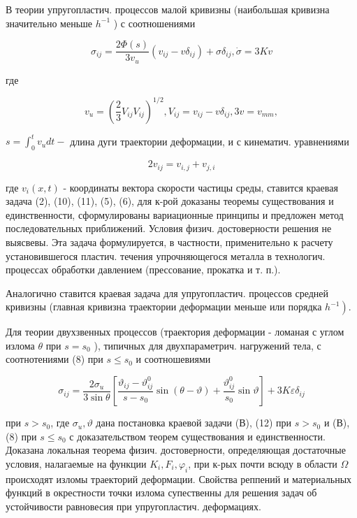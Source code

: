 \documentclass[10pt]{article}
\begin{document}
В теории упругопластич. процессов малой кривизны (наибольшая кривизна значительно меньше $h^{-1}$ ) с соотношениями



\[

\sigma_{i j}=\frac{2 \Phi(s)}{3 v_{u}}\left(v_{i j}-v \delta_{i j}\right)+\sigma \delta_{i j}, \dot{\sigma}=3 K v

\]



где



\[

v_{u}=\left(\frac{2}{3} V_{i j} V_{i j}\right)^{1 / 2}, V_{i j}=v_{i j}-v \delta_{i j}, 3 v=v_{m m},

\]



$s=\int_{0}^{t} v_{u} d t-$ длина дуги траектории деформации, и с кинематич. уравнениями



\[

2 v_{i j}=v_{i, j}+v_{j, i}

\]



где $v_{i}(x, t)$ - координаты вектора скорости частицы среды, ставится краевая задача (2), (10), (11), (5), (6), для к-рой доказаны теоремы существования и единственности, сформулированы вариационные принципы и предложен метод последовательных приближений. Условия физич. достоверности решения не выясвевы. Эта задача формулируется, в частности, применительно к расчету установившегося пластич. течения упрочняющегося металла в технологич. процессах обработки давлением (прессование, прокатка и т. п.).



Аналогично ставится краевая задача для упругопластич. процессов средней кривизны (главная кривизна траектории деформации меньше или порядка $\left.h^{-1}\right)$.



Для теории двухзвенных процессов (траектория деформации - ломаная с углом излома $\theta$ при $s=s_{0}$ ), типичных для двухпараметрич. нагружений тела, с соотнотениями (8) при $s \leqslant s_{0}$ и соотношевиями



\[

\sigma_{i j}=\frac{2 \sigma_{u}}{3 \sin \theta}\left[\frac{\vartheta_{i j}-\vartheta_{i j}^{0}}{s-s_{0}} \sin (\theta-\vartheta)+\frac{\vartheta_{i j}^{0}}{s_{0}} \sin \vartheta\right]+3 K \varepsilon \delta_{i j}

\]



при $s>s_{0}$, где $\sigma_{u}, \vartheta$ дана постановка краевой задачи (В), (12) при $s>s_{0}$ и (В), (8) при $s \leqslant s_{0}$ с доказательством теорем существования и единственности. Доказана локальная теорема физич. достоверности, определяющая достаточные условия, налагаемые на функции $K_{i}, F_{i}, \varphi_{i}$, при к-рых почти всюду в области $\Omega$ происходят изломы траекторий деформации. Свойства реппений и материальных функций в окрестности точки излома супественны для решения задач об устойчивости равновесия при упругопластич. деформациях.
\end{document}
